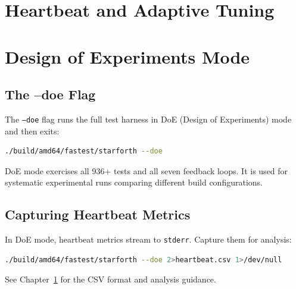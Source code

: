 \chapter{Heartbeat and Adaptive Tuning}
\label{chap:heartbeat}



\chapter{Design of Experiments Mode}
\label{chap:doe}

\section{The --doe Flag}
\label{sec:doe-flag}

The \texttt{--doe} flag runs the full test harness in DoE (Design of
Experiments) mode and then exits:

\begin{lstlisting}[language=bash]
./build/amd64/fastest/starforth --doe
\end{lstlisting}

DoE mode exercises all 936+ tests and all seven feedback loops. It is used for
systematic experimental runs comparing different build configurations.

\section{Capturing Heartbeat Metrics}
\label{sec:doe-capture}

In DoE mode, heartbeat metrics stream to \texttt{stderr}. Capture them for
analysis:

\begin{lstlisting}[language=bash]
./build/amd64/fastest/starforth --doe 2>heartbeat.csv 1>/dev/null
\end{lstlisting}

See Chapter~\ref{chap:heartbeat} for the CSV format and analysis guidance.

